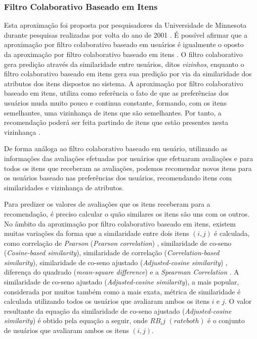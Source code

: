 \documentclass[12pt,
				openright,
				twoside,
				a4paper,
				apter=TITLE,
				section=TITLE,
				subsection=TITLE,
				chapter=TITLE,
				english,
				brazil]{abntex2}
\begin{document}
\subsubsection{Filtro Colaborativo Baseado em Itens}
Esta aproximação foi proposta por pesquisadores da Universidade de Minnesota durante pesquisas realizadas por volta do ano de 2001 \cite{sarwar2001item}. É possível afirmar que a aproximação por filtro colaborativo baseado em usuários é igualmente o oposto da aproximação por filtro colaborativo baseado em itens \cite{schafer2007collaborative}. O filtro colaborativo gera predição através da similaridade entre usuários, ditos \textit{vizinhos}, enquanto o filtro colaborativo baseado em itens gera sua predição por via da similaridade dos atributos dos itens dispostos no sistema. A aproximação por filtro colaborativo baseado em itens, utiliza como referência o fato de que as preferências dos usuários muda muito pouco e continua constante, formando, com os itens semelhantes, uma vizinhança de itens que são semelhantes. Por tanto, a recomendação poderá ser feita partindo de itens que estão presentes nesta vizinhança \cite{asanov2011algorithms}.

De forma análoga ao filtro colaborativo baseado em usuário, utilizando as informações das avaliações efetuadas por usuários que efetuaram avaliações e para todos os itens que receberam as avaliações, podemos recomendar novos itens para os usuários baseado nas preferências dos usuários, recomendando itens com similaridades e vizinhança de atributos. 

Para predizer os valores de avaliações que os itens receberam para a recomendação, é preciso calcular o quão similares os itens são uns com os outros. No âmbito da aproximação por filtro colaborativo baseado em itens, existem muitas variações da forma que a similaridade entre dois itens $(i, j)$ é calculada, como correlação de \textit{Pearson} (\textit{Pearson correlation}) \cite{herlocker2000understanding}, similaridade de co-seno (\textit{Cosine-based similarity}), similaridade de correlação (\textit{Correlation-based similarity}), similaridade de co-seno ajustado (\textit{Adjusted-cosine similarity}) \cite{sarwar2001item}, diferença do quadrado (\textit{mean-square difference}) \cite{shardanand1995social} e a \textit{Spearman Correlation} \cite{massa2004using}. A similaridade de co-seno ajustado (\textit{Adjusted-cosine similarity}), a mais popular, considerada por muitos também como a mais exata, métrica de similaridade é calculada utilizando todos os usuários que avaliaram ambos os itens $i$ e $j$. O valor resultante da equação da similaridade de co-seno ajustado (\textit{Adjusted-cosine similarity}) é obtido pela equação a seguir, onde $RB_ij$ $(rate both)$ é o conjunto de usuários que avaliaram ambos os itens $(i, j)$.
\end{document}
